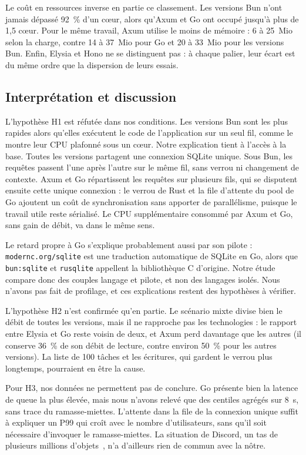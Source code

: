 \documentclass[conference,a4paper]{IEEEtran}
\begin{document}
Le coût en ressources inverse en partie ce classement. Les versions Bun
n'ont jamais dépassé 92~\% d'un cœur, alors qu'Axum et Go ont occupé
jusqu'à plus de 1,5 cœur. Pour le même travail, Axum utilise le moins de
mémoire : 6 à 25~Mio selon la charge, contre 14 à 37~Mio pour Go et
20 à 33~Mio pour les versions Bun. Enfin, Elysia et Hono ne se
distinguent pas : à chaque palier, leur écart est du même ordre que la
dispersion de leurs essais.

\subsection{Interprétation et discussion}
L'hypothèse H1 est réfutée dans nos conditions. Les versions Bun sont
les plus rapides alors qu'elles exécutent le code de l'application sur
un seul fil, comme le montre leur CPU plafonné sous un cœur. Notre
explication tient à l'accès à la base. Toutes les versions partagent une
connexion SQLite unique. Sous Bun, les requêtes passent l'une après
l'autre sur le même fil, sans verrou ni changement de contexte. Axum et
Go répartissent les requêtes sur plusieurs fils, qui se disputent ensuite
cette unique connexion : le verrou de Rust et la file d'attente du pool
de Go ajoutent un coût de synchronisation sans apporter de parallélisme,
puisque le travail utile reste sérialisé. Le CPU supplémentaire consommé
par Axum et Go, sans gain de débit, va dans le même sens.

Le retard propre à Go s'explique probablement aussi par son pilote :
\texttt{modernc.org/sqlite} est une traduction automatique de SQLite en
Go, alors que \texttt{bun:sqlite} et \texttt{rusqlite} appellent la
bibliothèque C d'origine. Notre étude compare donc des couples langage
et pilote, et non des langages isolés. Nous n'avons pas fait de
profilage, et ces explications restent des hypothèses à vérifier.

L'hypothèse H2 n'est confirmée qu'en partie. Le scénario mixte divise
bien le débit de toutes les versions, mais il ne rapproche pas les
technologies : le rapport entre Elysia et Go reste voisin de deux, et
Axum perd davantage que les autres (il conserve 36~\% de son débit de
lecture, contre environ 50~\% pour les autres versions). La liste de
100 tâches et les écritures, qui gardent le verrou plus longtemps,
pourraient en être la cause.

Pour H3, nos données ne permettent pas de conclure. Go présente bien la
latence de queue la plus élevée, mais nous n'avons relevé que des
centiles agrégés sur 8~s, sans trace du ramasse-miettes. L'attente dans
la file de la connexion unique suffit à expliquer un P99 qui croît avec
le nombre d'utilisateurs, sans qu'il soit nécessaire d'invoquer le
ramasse-miettes. La situation de Discord, un tas de plusieurs millions
d'objets~\cite{discord}, n'a d'ailleurs rien de commun avec la nôtre.
\end{document}
